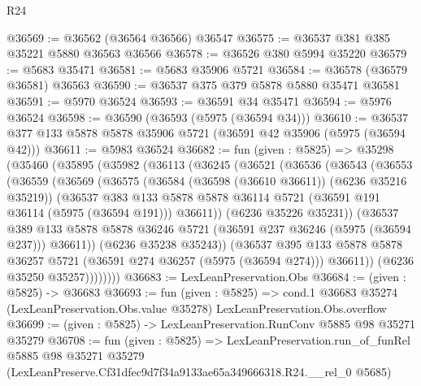 \begin{lexlean}{R24}
\begin{coremodule}
@36569 := @36562 (@36564 @36566) @36547
@36575 := @36537 @381 @385 @35221 @5880 @36563 @36566
@36578 := @36526 @380 @5994 @35220
@36579 := @5683 @35471
@36581 := @5683 @35906 @5721
@36584 := @36578 (@36579 @36581) @36563
@36590 := @36537 @375 @379 @5878 @5880 @35471 @36581
@36591 := @5970 @36524
@36593 := @36591 @34 @35471
@36594 := @5976 @36524
@36598 := @36590 (@36593 (@5975 (@36594 @34)))
@36610 := @36537 @377 @133 @5878 @5878 @35906 @5721 (@36591 @42 @35906 (@5975 (@36594 @42)))
@36611 := @5983 @36524
@36682 := fun (given : @5825) =>
  @35298
    (@35460
      (@35895
        (@35982
          (@36113
            (@36245
              (@36521
                (@36536
                  (@36543
                    (@36553
                      (@36559
                        (@36569
                          (@36575
                            (@36584 (@36598 (@36610 @36611)) (@6236 @35216 @35219))
                            (@36537
                              @383
                              @133
                              @5878
                              @5878
                              @36114
                              @5721
                              (@36591 @191 @36114 (@5975 (@36594 @191)))
                              @36611))
                          (@6236 @35226 @35231))
                        (@36537
                          @389
                          @133
                          @5878
                          @5878
                          @36246
                          @5721
                          (@36591 @237 @36246 (@5975 (@36594 @237)))
                          @36611))
                      (@6236 @35238 @35243))
                    (@36537
                      @395
                      @133
                      @5878
                      @5878
                      @36257
                      @5721
                      (@36591 @274 @36257 (@5975 (@36594 @274)))
                      @36611))
                  (@6236 @35250 @35257))))))))
@36683 := LexLeanPreservation.Obs
@36684 := (given : @5825) -> @36683
@36693 := fun (given : @5825) =>
  cond.{1} @36683 @35274 (LexLeanPreservation.Obs.value @35278) LexLeanPreservation.Obs.overflow
@36699 := (given : @5825) -> LexLeanPreservation.RunConv @5885 @98 @35271 @35279
@36708 := fun (given : @5825) =>
  LexLeanPreservation.run_of_funRel
    @5885
    @98
    @35271
    @35279
    (LexLeanPreserve.Cf31dfec9d7f34a9133ae65a349666318.R24.__rel_0 @5685)
\end{coremodule}
\end{lexlean}
